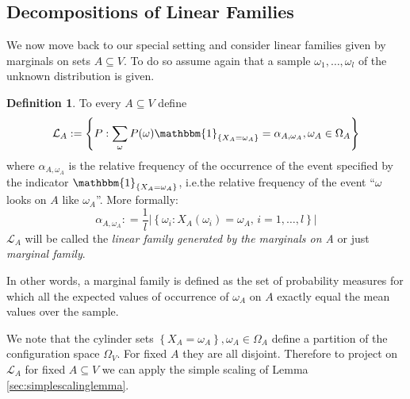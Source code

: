 \documentclass[12pt]{amsart}
\newcommand{\set}[1]{\left\lbrace #1 \right\rbrace} %
\newcommand{\defas}{\mathrel{\mathop{:}}=}   %
\renewcommand{\subset}{\subseteq}  %
\newcommand{\comment}[1]{ }
\providecommand{\abs}[1]{\left\lvert#1\right\rvert}
\newcommand{\Ind}[1]{\mathbbm{1}_{\lbrace #1 \rbrace}} %
\newcommand{\ie}{i.e.\;}  %
\theoremstyle{plain}%
\theoremstyle{definition}
\newtheorem{defn}[thm]{Definition}
\theoremstyle{remark}
\begin{document}
\subsection{Decompositions of Linear Families}
We now move back to our special setting and consider linear families
given by marginals on sets $A\subset V$. To do so assume again that a
sample $\omega_1,\ldots,\omega_l$ of the unknown distribution is
given. \comment{ To project to these families we can apply the simple
  scaling argument given above. Then we will show that this is
  applicable for linear families $\mathcal{L}_\mathcal{A}$ constructed
  from hypergraphs. }

\begin{defn}
  To every $A\subset V$ define
\begin{equation*}
  \label{eq:definitionsofLa}
  \mathcal{L}_A \defas \set {P : \sum_{\omega} P(\omega) \Ind{X_A = \omega_A} = \alpha_{A,\omega_A} , \omega_A \in \Omega_A}
\end{equation*} 
where $\alpha_{A,\omega_A}$ is the relative frequency of the
occurrence of the event specified by the indicator $\Ind{X_A =
  \omega_A}$, \ie the relative frequency of the event ``$\omega$ looks
on $A$ like $\omega_A$''. More formally:
\begin{equation*}
  \alpha_{A,\omega_A} \defas \frac{1}{l} 
\abs{\set{ \omega_i : X_A(\omega_i) = \omega_A, \, i=1,\ldots,l }}
\end{equation*}
$\mathcal{L}_A$ will be called the \emph{linear family generated by
  the marginals on A} or just \emph{marginal family}. 
\end{defn}

In other words, a marginal family is defined as the set of probability
measures for which all the expected values of occurrence of $\omega_A$
on $A$ exactly equal the mean values over the sample.

We note that the cylinder sets $\set{X_A = \omega_A} ,
\omega_A\in\Omega_A$ define a partition of the configuration space
$\Omega_V$. For fixed $A$ they are all disjoint. Therefore to project
on $\mathcal{L}_A$ for fixed $A\subset V$ we can apply the simple
scaling of Lemma \ref{sec:simplescalinglemma}.
\end{document}
